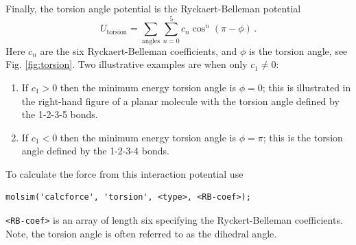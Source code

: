 \documentclass[11pt]{article}
\begin{document}
Finally, the torsion angle potential is the Ryckaert-Belleman potential 
\begin{equation}
  U_\mathrm{torsion}=\sum_{\mathrm{angles}} \sum_{n=0}^5 c_n
  \cos^n(\pi-\phi)
   \, . 
\end{equation}
Here $c_n$ are the six Ryckaert-Belleman coefficients, and $\phi$ is the
torsion angle, see Fig. \ref{fig:torsion}. Two illustrative 
examples are when only $c_1 \neq 0$:
\begin{enumerate}
\item If $c_1 > 0$ then the minimum energy torsion angle is $\phi = 0$; this is
  illustrated in the right-hand figure of a planar molecule with the torsion
  angle defined by the 1-2-3-5 bonds. 
\item If $c_1 < 0$ then the minimum energy torsion angle is $\phi = \pi$; this
  is the torsion angle defined by the 1-2-3-4 bonds. 
\end{enumerate}
To calculate the force from this interaction potential use
\begin{verbatim}
molsim('calcforce', 'torsion', <type>, <RB-coef>);
\end{verbatim}
\verb!<RB-coef>! is an array of length six specifying the Ryckert-Belleman
coefficients. Note, the torsion angle is often referred to as the dihedral angle. 
\end{document}
